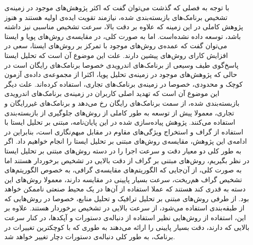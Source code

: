 با توجه به فصلی که گذشت می‌توان گفت که اکثر پژوهش‌های موجود در زمینه‌ی تشخیص برنامک‌های بازبسته‌بندی شده، نیازمند تقویت ایده‌ی اولیه هستند و هنوز پژوهش کاملی در این زمینه که علاوه بر دقت بالا، سرعت تشخیص مناسبی نیز داشته باشد، توسعه داده نشده‌است. اما به صورت کلی، در مقایسه‌ی روش‌های پویا و ایستا می‌توان گفت که عمده‌ی روش‌های موجود با تمرکز بر روش‌های ایستا، سعی در افزایش کارای روش‌های پیشین دارند. علت این موضوع آن است که تحلیل ایستا پاسخ‌گوی طیف وسیعی از برنامک‌های اندرویدی خصوصا برنامک‌های رایگان است در حالی که پژوهش‌های موجود در زمینه‌ی تحلیل پویا، اکثرا از مجموعه‌ی داده‌ی آزمون کوچک و محدودی، خصوصا در زمینه‌ی برنامک‌های تجاری، استفاده کرده‌اند. علت دیگر این موضوع آن است که تهدید اصلی کاربران در زمینه‌ی برنامک‌های اندرویدی بازبسته‌بندی شده، از سمت برنامک‌های رایگان رخ می‌دهد و برنامک‌های غیررایگان و تجاری، معمولا پیش از توسعه به طور کاملی از روش‌های جلوگیری از بازبسته‌بندی استفاده می‌کنند. پژوهش پیاده‌سازی شده در این پایان‌نامه، مبتنی بر تحلیل ایستا با استفاده از گراف و استخراج ویژگی‌های مقاوم در مقابل مبهم‌نگاری است، بنابراین در ادامه‌ی این پژوهش، مقایسه‌ی روش‌های مبتنی بر تحلیل ایستا را انجام خواهیم داد. اگر به طور کلی دو معیار دقت و سرعت اجرا را در دسته‌ روش‌های مبتنی بر تحلیل ایستا در نظر بگیریم، روش‌های مبتنی بر گراف از دقت بالایی در تشخیص برخوردار هستند اما به صورت کلی، از آن‌جایی که الگوریتم‌های مقایسه‌ی گرافی، به خصوص الگوریتم‌های تشخیص گراف هم‌ریخت، سرعت بسیار پایینی در  مقایسه دارند، معمولا روش‌های این دسته به قدری کند هستند که عملا استفاده از آن‌ها در یک محیط صنعتی ناممکن خواهد بود. از طرفی روش‌های مبتنی بر تحلیل ترافیک و تحلیل منابع، خصوصا در روش‌هایی که از طبقه‌بندی استفاده می‌شود، از سرعت بالایی در تشخیص برخوردار هستند. علاوه بر این، استفاده از روش‌هایی نظیر استفاده از دنباله‌‌ی دستورات و آپکد‌ها، در کنار سرعت بالایی که دارند، دقت بسیار پایینی را ارائه می‌دهند به طوری که با کوچکترین تغییرات در برنامک، به طور کلی دنباله‌ی دستورات دچار تغییر خواهد شد.
\\
